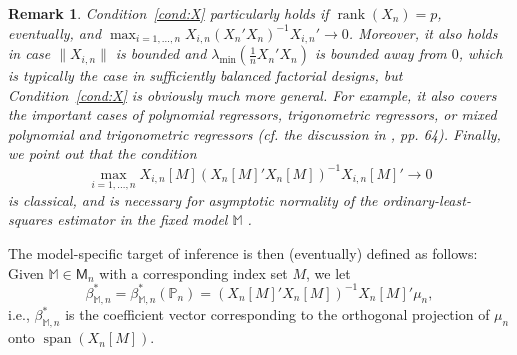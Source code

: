 \documentclass[preprint]{imsart}
\newcommand{\M}{\mathbb M}
\DeclareMathOperator{\rank}{rank}
\DeclareMathOperator{\s}{span}
\newtheorem{remark}[theorem]{Remark}
\numberwithin{equation}{section}
\begin{document}
\begin{remark}
Condition~\ref{cond:X} particularly holds if $\rank(X_n) = p$, eventually, and $\max_{i=1,\dots, n} X_{i,n}(X_n'X_n)^{-1}X_{i,n}' \to 0$. Moreover, it also holds in case $\|X_{i,n}\|$ is bounded and $\lambda_{\min}(\frac{1}{n} X_n'X_n)$ is bounded away from $0$, which is typically the case in sufficiently balanced factorial designs, but Condition~\ref{cond:X} is obviously much more general. For example, it also covers the important cases of polynomial regressors, trigonometric regressors, or mixed polynomial and trigonometric regressors (cf. the discussion in \cite{eicker67}, pp. 64).
Finally, we point out that the condition
\begin{equation*}
\max_{i = 1, \hdots, n} X_{i,n}[M] \left( X_{n}[M]'X_{n}[M]  \right)^{-1} X_{i,n}[M]' \to 0
\end{equation*}
is classical, and is necessary for asymptotic normality of the ordinary-least-squares estimator in the fixed model $\M$ \citep[see][]{Huber73, Arnold80}.

\end{remark}

The model-specific target of inference is then (eventually) defined as follows: Given $\mathbb{M}\in \mathsf{M}_n$ with a corresponding index set $M$, we let
%
\begin{equation}\label{eqn:targethom}
\beta_{\mathbb{M}, n}^* = \beta_{\mathbb{M}, n}^*(\mathbb{P}_n) = \left(X_n[M]'X_n[M]\right)^{-1} X_n[M]'  \mu_n,
\end{equation}
%
i.e., $\beta_{\M,n}^*$ is the coefficient vector corresponding to the orthogonal projection of $\mu_n$ onto $\s(X_n[M])$. 
\end{document}
